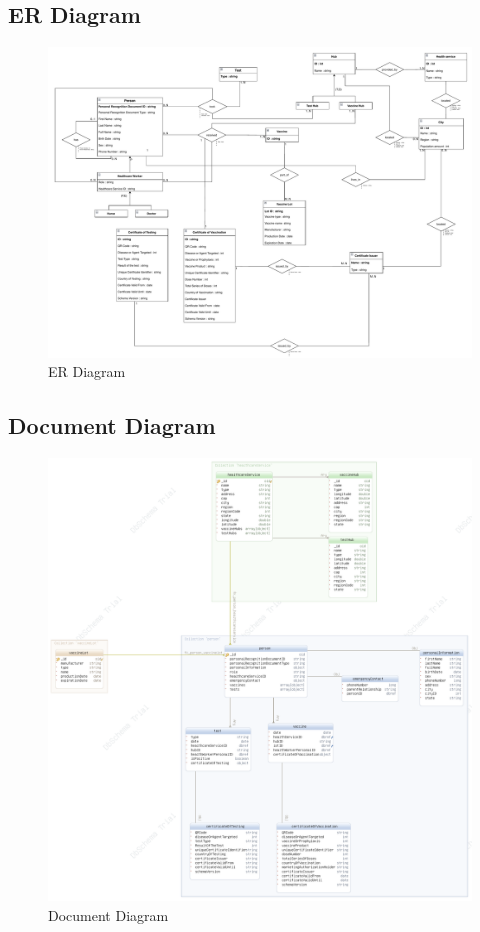 \documentclass{article}[IEEEtran]
\begin{document}
\subsection{ER Diagram}

\begin{figure}[H]
\begin{center}
    \includegraphics[width=\textwidth]{mongdb-er.pdf}
    \caption{ER Diagram}
\end{center}
\end{figure}

\subsection{Document Diagram}

\begin{figure}[H]
\begin{center}
    \includegraphics[width=\textwidth]{mongodb-docdiagram.pdf}
    \caption{Document Diagram}
\end{center}
\end{figure}
\end{document}

